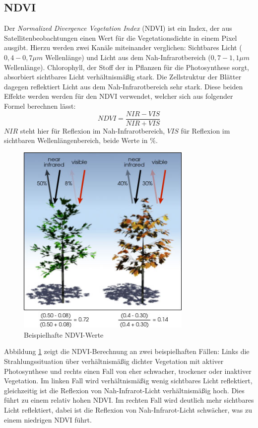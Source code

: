 \documentclass[]{article}
\begin{document}
\subsection{NDVI}
Der \textit{Normalized Divergence Vegetation Index} (NDVI) ist ein Index, der aus Satellitenbeobachtungen einen Wert für die Vegetationsdichte in einem Pixel ausgibt. Hierzu werden zwei Kanäle miteinander verglichen: Sichtbares Licht ($0,4-0,7 \mu m$ Wellenlänge) und Licht aus dem Nah-Infrarotbereich ($0,7 - 1,1 \mu m$ Wellenlänge). Chlorophyll, der Stoff der in Pflanzen für die Photosynthese sorgt, absorbiert sichtbares Licht verhältnismäßig stark. Die Zellstruktur der Blätter dagegen reflektiert Licht aus dem Nah-Infrarotbereich sehr stark. Diese beiden Effekte werden werden für den NDVI verwendet, welcher sich aus folgender Formel berechnen lässt:
\begin{equation}
NDVI=\frac{NIR - VIS}{NIR + VIS}
\end{equation}
$NIR$ steht hier für Reflexion im Nah-Infrarotbereich, $VIS$ für Reflexion im sichtbaren Wellenlängenbereich, beide Werte in $\%$.
\begin{figure}
	\centering
  \includegraphics[width=0.75\textwidth]{ndvi_example.jpg}
	\caption{Beispielhafte NDVI-Werte}
	\label{fig1}
\end{figure}
Abbildung \ref{fig1} zeigt die NDVI-Berechnung an zwei beispielhaften Fällen: Links die Strahlungssituation über verhältnismäßig dichter Vegetation mit aktiver Photosynthese und rechts einen Fall von eher schwacher, trockener oder inaktiver Vegetation. Im linken Fall wird verhältnismäßig wenig sichtbares Licht reflektiert, gleichzeitig ist die Reflexion von Nah-Infrarot-Licht verhältnismäßig hoch. Dies führt zu einem relativ hohen NDVI. Im rechten Fall wird deutlich mehr sichtbares Licht reflektiert, dabei ist die Reflexion von Nah-Infrarot-Licht schwächer, was zu einem niedrigen NDVI führt.
\end{document}
